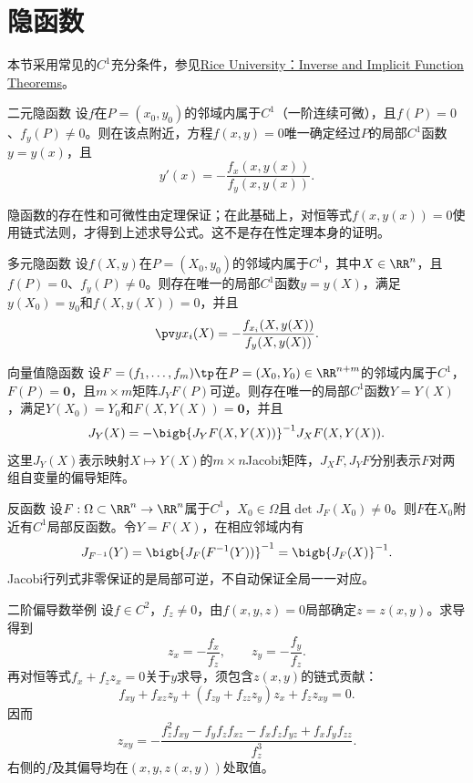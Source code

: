 \section{隐函数}
本节采用常见的$C^1$充分条件，参见\href{https://math.rice.edu/~hardt/401F03/ift.pdf}{Rice University：Inverse and Implicit Function Theorems}。
\begin{theorem}{二元隐函数}{}
    设$f$在$P=(x_0,y_0)$的邻域内属于$C^1$（一阶连续可微），且$f(P)=0$、$f_y(P)\neq0$。则在该点附近，方程$f(x,y)=0$唯一确定经过$P$的局部$C^1$函数$y=y(x)$，且
    \[
        y'(x)=-\frac{f_x(x,y(x))}{f_y(x,y(x))}.
    \]
\end{theorem}
隐函数的存在性和可微性由定理保证；在此基础上，对恒等式$f(x,y(x))=0$使用链式法则，才得到上述求导公式。这不是存在性定理本身的证明。
\begin{theorem}{多元隐函数}{}
    设$f(X,y)$在$P=(X_0,y_0)$的邻域内属于$C^1$，其中$X\in\RR^n$，且$f(P)=0$、$f_y(P)\neq0$。则存在唯一的局部$C^1$函数$y=y(X)$，满足$y(X_0)=y_0$和$f(X,y(X))=0$，并且
    \[
        \pv y{x_i}(X)=-\frac{f_{x_i}(X,y(X))}{f_y(X,y(X))}.
    \]
\end{theorem}
\begin{theorem}{向量值隐函数}{}
    设$F=(f_1,\ldots,f_m)\tp$在$P=(X_0,Y_0)\in\RR^{n+m}$的邻域内属于$C^1$，$F(P)=\bm0$，且$m\times m$矩阵$J_YF(P)$可逆。则存在唯一的局部$C^1$函数$Y=Y(X)$，满足$Y(X_0)=Y_0$和$F(X,Y(X))=\bm0$，并且
    \[
        J_Y(X)=-\bigb{J_YF(X,Y(X))}^{-1}J_XF(X,Y(X)).
    \]
    这里$J_Y(X)$表示映射$X\mapsto Y(X)$的$m\times n$Jacobi矩阵，$J_XF,J_YF$分别表示$F$对两组自变量的偏导矩阵。
\end{theorem}
\begin{theorem}{反函数}{}
    设$F:\Omega\subset\RR^n\to\RR^n$属于$C^1$，$X_0\in\Omega$且$\det J_F(X_0)\neq0$。则$F$在$X_0$附近有$C^1$局部反函数。令$Y=F(X)$，在相应邻域内有
    \[
        J_{F^{-1}}(Y)=\bigb{J_F(F^{-1}(Y))}^{-1}=\bigb{J_F(X)}^{-1}.
    \]
    Jacobi行列式非零保证的是局部可逆，不自动保证全局一一对应。
\end{theorem}
\begin{example}{二阶偏导数举例}{}
    设$f\in C^2$，$f_z\neq0$，由$f(x,y,z)=0$局部确定$z=z(x,y)$。求导得到
    \[
        z_x=-\frac{f_x}{f_z},\qquad z_y=-\frac{f_y}{f_z}.
    \]
    再对恒等式$f_x+f_z z_x=0$关于$y$求导，须包含$z(x,y)$的链式贡献：
    \[
        f_{xy}+f_{xz}z_y+(f_{zy}+f_{zz}z_y)z_x+f_z z_{xy}=0.
    \]
    因而
    \[
        z_{xy}=-\frac{f_z^2f_{xy}-f_yf_zf_{xz}-f_xf_zf_{yz}+f_xf_yf_{zz}}{f_z^3}.
    \]
    右侧的$f$及其偏导均在$(x,y,z(x,y))$处取值。
\end{example}
